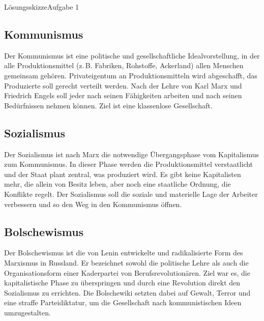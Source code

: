 \documentclass[11pt,a4paper,oneside]{article}
\begin{document}
	\begin{histloesung}{Lösungsskizze}{Aufgabe 1}
		\subsection*{Kommunismus}
		Der Kommunismus ist eine politische und gesellschaftliche Idealvorstellung, in der alle Produktionsmittel (z.\,B. Fabriken, Rohstoffe, Ackerland) allen Menschen gemeinsam gehören. Privateigentum an Produktionsmitteln wird abgeschafft, das Produzierte soll gerecht verteilt werden. Nach der Lehre von Karl Marx und Friedrich Engels soll jeder nach seinen Fähigkeiten arbeiten und nach seinen Bedürfnissen nehmen können. Ziel ist eine klassenlose Gesellschaft.\\
		
		\subsection*{Sozialismus}
		Der Sozialismus ist nach Marx die notwendige Übergangsphase vom Kapitalismus zum Kommunismus. In dieser Phase werden die Produktionsmittel verstaatlicht und der Staat plant zentral, was produziert wird. Es gibt keine Kapitalisten mehr, die allein von Besitz leben, aber noch eine staatliche Ordnung, die Konflikte regelt. Der Sozialismus soll die soziale und materielle Lage der Arbeiter verbessern und so den Weg in den Kommunismus öffnen.\\
		
		\subsection*{Bolschewismus}
		Der Bolschewismus ist die von Lenin entwickelte und radikalisierte Form des Marxismus in Russland. Er bezeichnet sowohl die politische Lehre als auch die Organisationsform einer Kaderpartei von Berufsrevolutionären. Ziel war es, die kapitalistische Phase zu überspringen und durch eine Revolution direkt den Sozialismus zu errichten. Die Bolschewiki setzten dabei auf Gewalt, Terror und eine straffe Parteidiktatur, um die Gesellschaft nach kommunistischen Ideen umzugestalten.\\
	\end{histloesung}
	
	\newpage
	
\end{document}
